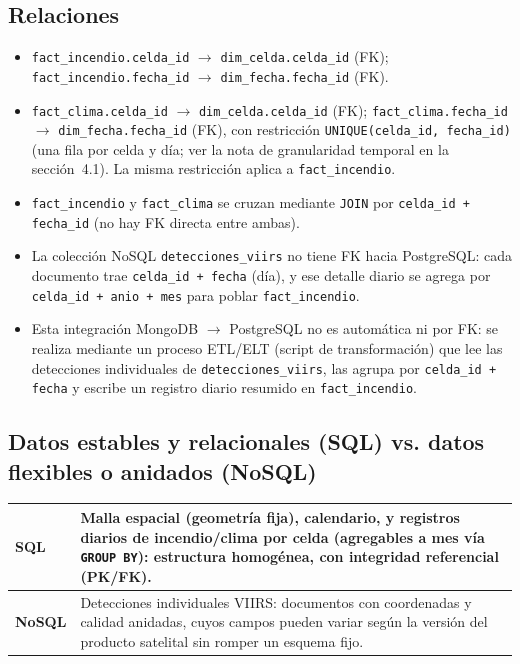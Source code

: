 \documentclass[11pt,a4paper]{article}
\begin{document}
\subsection{Relaciones}
\begin{itemize}
    \item \texttt{fact\_incendio.celda\_id} $\rightarrow$ \texttt{dim\_celda.celda\_id} (FK); \texttt{fact\_incendio.fecha\_id} $\rightarrow$ \texttt{dim\_fecha.fecha\_id} (FK).
    \item \texttt{fact\_clima.celda\_id} $\rightarrow$ \texttt{dim\_celda.celda\_id} (FK); \texttt{fact\_clima.fecha\_id} $\rightarrow$ \texttt{dim\_fecha.fecha\_id} (FK), con restricci\'on \texttt{UNIQUE(celda\_id, fecha\_id)} (una fila por celda y d\'ia; ver la nota de granularidad temporal en la secci\'on~4.1). La misma restricci\'on aplica a \texttt{fact\_incendio}.
    \item \texttt{fact\_incendio} y \texttt{fact\_clima} se cruzan mediante \texttt{JOIN} por \texttt{celda\_id + fecha\_id} (no hay FK directa entre ambas).
    \item La colecci\'on NoSQL \texttt{detecciones\_viirs} no tiene FK hacia PostgreSQL: cada documento trae \texttt{celda\_id + fecha} (d\'ia), y ese detalle diario se agrega por \texttt{celda\_id + anio + mes} para poblar \texttt{fact\_incendio}.
    \item Esta integraci\'on MongoDB $\to$ PostgreSQL no es autom\'atica ni por FK: se realiza mediante un proceso ETL/ELT (script de transformaci\'on) que lee las detecciones individuales de \texttt{detecciones\_viirs}, las agrupa por \texttt{celda\_id + fecha} y escribe un registro diario resumido en \texttt{fact\_incendio}.
\end{itemize}

\subsection{Datos estables y relacionales (SQL) vs. datos flexibles o anidados (NoSQL)}

\begin{tabularx}{\textwidth}{@{}lX@{}}
\toprule
\textbf{SQL} & Malla espacial (geometr\'ia fija), calendario, y registros diarios de incendio/clima por celda (agregables a mes v\'ia \texttt{GROUP BY}): estructura homog\'enea, con integridad referencial (PK/FK). \\
\midrule
\textbf{NoSQL} & Detecciones individuales VIIRS: documentos con coordenadas y calidad anidadas, cuyos campos pueden variar seg\'un la versi\'on del producto satelital sin romper un esquema fijo. \\
\bottomrule
\end{tabularx}
\end{document}

